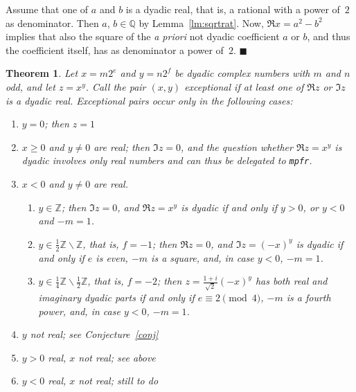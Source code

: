 \documentclass [11pt]{article}
\newcommand {\mpfr}{{\tt mpfr}}
\newcommand {\Z}{\mathbb Z}
\newcommand {\Q}{\mathbb Q}
\renewcommand {\geq}{\geqslant}
\newtheorem{theorem}{Theorem}
\newenvironment{proof}{\noindent{\bf Proof:}}{{\hspace* {\fill}$\blacksquare$}}
\begin{document}
\begin{proof}
Assume that one of $a$ and $b$ is a dyadic real, that is, a rational with
a power of~$2$ as denominator. Then $a$, $b \in \Q$ by Lemma~\ref {lm:sqrtrat}.
Now, $\Re x = a^2 - b^2$ implies that also the square of the \textit {a priori}
not dyadic coefficient $a$ or $b$, and thus the coefficient itself,
has as denominator a power of~$2$.
\end{proof}


\begin {theorem}
Let $x = m 2^e$ and $y = n 2^f$ be dyadic complex numbers with $m$ and $n$ odd,
and let $z = x^y$. Call the pair $(x, y)$ {\em exceptional} if at least
one of $\Re z$ or $\Im z$ is a dyadic real. Exceptional pairs occur
only in the following cases:
\begin {enumerate}
\item
$y = 0$; then $z = 1$
\item
$x \geq 0$ and $y \neq 0$ are real; then $\Im z = 0$, and the question
whether $\Re z = x^y$ is dyadic involves only real numbers and
can thus be delegated to \mpfr.
\item
$x < 0$ and $y \neq 0$ are real.
\begin {enumerate}
\item
$y \in \Z$; then $\Im z = 0$, and $\Re z = x^y$ is dyadic if and only if
$y > 0$, or $y < 0$ and $-m = 1$.
\item
$y \in \frac {1}{2} \Z \backslash \Z$, that is, $f = -1$;
then $\Re z = 0$, and $\Im z = (-x)^y$ is dyadic if and only if
$e$ is even, $-m$ is a square, and, in case $y < 0$, $-m = 1$.
\item
$y \in \frac {1}{4} \Z \backslash \frac {1}{2} \Z$, that is, $f = -2$;
then $z = \frac {1 + i}{\sqrt 2} (-x)^y$ has both real and imaginary
dyadic parts if and only if
$e \equiv 2 \pmod 4$, $-m$ is a fourth power, and, in case $y < 0$, $-m = 1$.
\end {enumerate}
\item
$y$ not real;
see Conjecture~\ref {conj}
\item
$y > 0$ real, $x$ not real;
see above
\item
$y < 0$ real, $x$ not real;
still to do
\end {enumerate}
\end {theorem}
\end{document}
